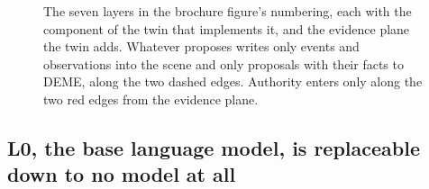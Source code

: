 \begin{figure}[t]
\centering

\caption{The seven layers in the brochure figure's numbering, each with the component of the twin
that implements it, and the evidence plane the twin adds. Whatever proposes writes only events and
observations into the scene and only proposals with their facts to DEME, along the two dashed
edges. Authority enters only along the two red edges from the evidence plane.}
\label{fig:pe-stack}
\end{figure}

\subsection*{L0, the base language model, is replaceable down to no model at all}

